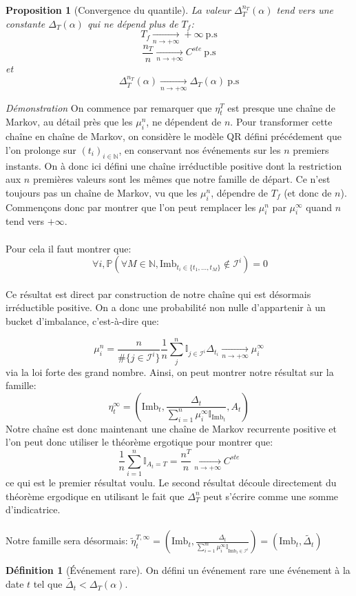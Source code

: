 \documentclass[12pt,a4paper]{article}
\newtheorem{proposition}[theorem]{Proposition}
\theoremstyle{definition}
\newtheorem{definition}[theorem]{Définition}
\theoremstyle{remark}
\begin{document}
\begin{proposition}[Convergence du quantile]
La valeur $\Delta_T^{n_T}(\alpha)$ tend vers une constante $\Delta_T(\alpha)$ qui ne dépend plus de $T_f$:
$$T_f\underset{n\to +\infty}{\to}+\infty \ \text{p.s}$$
$$\frac{n_T}{n}\underset{n\to +\infty}{\to}C^{ste} \ \text{p.s}$$
et
$$\Delta_T^{n_T}(\alpha)\underset{n\to +\infty}{\to}\Delta_T(\alpha) \ \text{p.s}$$
\end{proposition}
\textit{Démonstration}
On commence par remarquer que $\eta_t^T$ est presque une chaîne de Markov, au détail près que les $\mu_i^n$, ne dépendent de 
$n$.  Pour transformer cette chaîne en chaîne de Markov, on considère le modèle QR défini précédement que l'on prolonge sur $(t_i)_{i\in\mathbb{N}}$, en conservant nos événements sur les $n$ premiers instants. On à donc ici défini une chaîne irréductible positive dont la restriction aux $n$ premières valeurs sont les mêmes que notre famille de départ. Ce n'est toujours pas un chaîne de Markov, vu que les $\mu_i^n$, dépendre de $T_f$ (et donc de $n$). Commençons donc par montrer que l'on peut remplacer les $\mu_i^n$ par $\mu_i^{\infty}$ quand $n$ tend vers $+\infty$.
\\
\\
Pour cela il faut montrer que:
$$ \ \forall i,  \mathbb{P}\left(\forall M \in \mathbb{N}, \text{Imb}_{t_i\in\{t_1,\dots,t_M\}}\notin \mathcal{I}^{i}\right) = 0$$
\\
Ce résultat est direct par construction de notre chaîne qui est désormais irréductible positive. On a donc une probabilité non nulle d'appartenir à un bucket d'imbalance, c'est-à-dire que:

$$\mu_i^n = \frac{n}{\#\{j\in \mathcal I^i\}}\frac{1}{n}\sum_{j}^n\mathbb{I}_{j\in \mathcal I^i}\Delta_{t_i}\underset{n\to+\infty}{\to}\mu_i^{\infty}$$
via la loi forte des grand nombre. Ainsi, on peut montrer notre résultat sur la famille:
$$\eta_t^{\infty} = \left(\text{Imb}_t, \frac{\Delta_t}{\sum_{i=1}^n\mu_i^{\infty}\mathbb{I}_{\text{Imb}_t}}, A_t\right)$$
Notre chaîne est donc maintenant une chaîne de Markov recurrente positive et l'on peut donc utiliser le théorème ergotique pour montrer que:
$$\frac{1}{n}\sum_{i=1}^n\mathbb{I}_{A_t=T} = \frac{n^T}{n} \underset{n\to+\infty}{\to} C^{ste}$$
ce qui est le premier résultat voulu. Le second résultat découle directement du théorème ergodique en utilisant le fait que $\Delta_T^n$ peut s'écrire comme une somme d'indicatrice. 
\\
\\
Notre famille sera désormais: 
$\tilde \eta_t^{T,\infty} = \left(\text{Imb}_t, \frac{\Delta_t}{\sum_{i=1}^m\mu_i^{\infty}\mathbb{I}_{\text{Imb}_t\in\mathcal{I}^{i}}}\right)=\left(\text{Imb}_t, \tilde{\Delta_t}\right)$
\begin{definition}[Événement rare]
On défini un événement rare une événement à la date $t$ tel que $\tilde{\Delta_t}<\Delta_T(\alpha)$.
    
\end{definition}
\end{document}
